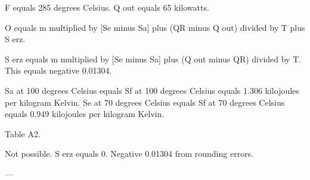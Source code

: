 F equals 285 degrees Celsius.  
Q out equals 65 kilowatts.  

O equals m multiplied by [Se minus Sa] plus (QR minus Q out) divided by T plus S erz.  

S erz equals m multiplied by [Se minus Sa] plus (Q out minus QR) divided by T.  
This equals negative 0.01304.  

Sa at 100 degrees Celsius equals Sf at 100 degrees Celsius equals 1.306 kilojoules per kilogram Kelvin.  
Se at 70 degrees Celsius equals Sf at 70 degrees Celsius equals 0.949 kilojoules per kilogram Kelvin.  

Table A2.  

Not possible.  
S erz equals 0.  
Negative 0.01304 from rounding errors.  

---